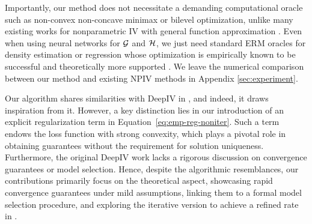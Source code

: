 Importantly, our method does not necessitate a demanding computational oracle such as non-convex non-concave minimax or bilevel optimization, unlike many existing works for nonparametric IV with general function approximation  \citep{lewis2018adversarial,xu2021deep, bennett2023minimax}. Even when using neural networks for $\mathcal{G}$ and $\mathcal{H}$, we just need standard ERM oracles for density estimation or regression whose optimization is empirically known to be successful and theoretically more supported \citep{du2019gradient,chen2018convergence,zaheer2018adaptive,barakat2021convergence,wu2019global,zhou2018convergence,ward2020adagrad}.  We leave the numerical comparison between our method and existing NPIV methods \citep{hartford2017deep, dikkala2020minimax,xu2021deep,singh2019kernel} in Appendix \ref{sec:experiment}.


\begin{remark}
Our algorithm shares similarities with DeepIV in \citep{hartford2017deep}, and indeed, it draws inspiration from it. However, a key distinction lies in our introduction of an explicit regularization term in Equation~\eqref{eq:emp-reg-noniter}. Such a term endows the loss function with strong convexity, which plays a pivotal role in obtaining guarantees without the requirement for solution uniqueness. Furthermore, the original DeepIV work lacks a rigorous discussion on convergence guarantees or model selection. Hence, despite the algorithmic resemblances, our contributions primarily focus on the theoretical aspect, showcasing rapid convergence guarantees under mild assumptions, linking them to a formal model selection procedure, and exploring the iterative version to achieve a refined rate in .
\end{remark}





